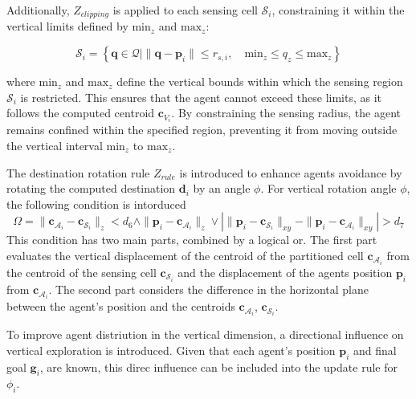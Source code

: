         Additionally, $Z_{clipping}$ is applied to each sensing cell $\mathcal{S}_i$, constraining it within the vertical limits defined by $\text{min}_z$ and $\text{max}_z$:

        \begin{equation}
            \mathcal{S}_i = \left\{\mathbf{q} \in \mathcal{Q} \mid \|\mathbf{q} - \mathbf{p}_i\| \leq r_{s,i}, \quad \text{min}_z \leq q_z \leq \text{max}_z \right\}
        \end{equation}

        where $\text{min}_z$ and $\text{max}_z$ define the vertical bounds within which the sensing region $\mathcal{S}_i$ is restricted. 
        This ensures that the agent cannot exceed these limits, as it follows the computed centroid \( \mathbf{c}_{V_i} \). 
        By constraining the sensing radius, the agent remains confined within the specified region, preventing it from moving outside the vertical interval $\text{min}_z$ to $\text{max}_z$.

        The destination rotation rule $Z_{rule}$ is introduced to enhance agents avoidance by rotating the computed destination $\mathbf{d}_i$ by an angle $\phi$.
        For vertical rotation angle $\phi$, the following condition is intorduced
        \begin{equation}
            \label{eqn:phi_condition}
            \Omega = \|\mathbf{c}_{\mathcal{A}_i} - \mathbf{c}_{\mathcal{S}_i}\|_z < d_6 \land \|\mathbf{p}_i - \mathbf{c}_{\mathcal{A}_i}\|_z \lor 
            | \|\mathbf{p}_i - \mathbf{c}_{\mathcal{S}_i}\|_{xy} - \|\mathbf{p}_i - \mathbf{c}_{\mathcal{A}_i}\|_{xy} | > d_7
        \end{equation}
        This condition has two main parts, combined by a logical or. The first part evaluates the vertical displacement of the centroid of the partitioned cell $\mathbf{c}_{\mathcal{A}_i}$ from the centroid of the sensing cell $\mathbf{c}_{\mathcal{S}_i}$ and the
        displacement of the agents position $\mathbf{p}_i$ from  $\mathbf{c}_{\mathcal{A}_i}$.
        The second part considers the difference in the horizontal plane between the agent's position and the centroids $\mathbf{c}_{\mathcal{A}_i}$, $\mathbf{c}_{\mathcal{S}_i}$.

        To improve agent distriution in the vertical dimension, a directional influence on vertical exploration is introduced. 
        Given that each agent's position $\mathbf{p}_i$ and final goal $\mathbf{g}_i$, are known, this direc influence can be included into the update rule for $\phi_i$.

